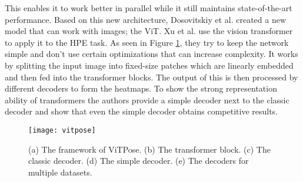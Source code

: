 This enables it to work better in parallel while it still maintains state-of-the-art performance.
Based on this new architecture, Dosovitskiy et al. \cite{Dosovitskiy2020} created a new model that can work with images; the \gls{ViT}.
Xu et al. \cite{xu2022} use the vision transformer to apply it to the HPE task.
As seen in Figure \ref{fig:vitpose}, they try to keep the network simple and don't use certain optimizations that can increase complexity.
It works by splitting the input image into fixed-size patches which are linearly embedded and then fed into the transformer blocks.
The output of this is then processed by different decoders to form the heatmaps.
To show the strong representation ability of transformers the authors provide a simple decoder next to the classic decoder and show that even the simple decoder obtains competitive results.

\begin{figure}[h]
	\centering
	\texttt{[image: vitpose]}%
	\caption{
		(a) The framework of ViTPose. (b) The transformer block. (c) The classic decoder. (d) The simple decoder. (e) The decoders for multiple datasets. \cite{xu2022}
	}
	\label{fig:vitpose}
\end{figure}

